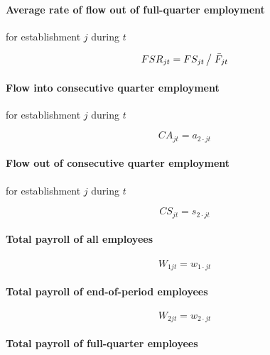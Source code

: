 \paragraph{Average rate of flow out of full-quarter employment}

for establishment $j$ during $t$

\begin{equation}
FSR_{jt} = {FS_{jt} } \left/ {\vphantom {{FS_{jt} } {\bar {F}_{jt} }}}
\right. {\bar {F}_{jt} }
\end{equation}

\paragraph{Flow into consecutive quarter employment}

for establishment $j$ during $t$

\begin{equation}
CA_{jt} = a_{2\cdot jt}
\end{equation}

\paragraph{Flow out of consecutive quarter employment}

for establishment $j$ during $t$

\begin{equation}
CS_{jt} = s_{2\cdot jt}
\end{equation}

\paragraph{Total payroll of all employees}

\begin{equation}
W_{1jt} = w_{1\cdot jt}
\end{equation}

\paragraph{Total payroll of end-of-period employees}

\begin{equation}
W_{2jt} = w_{2\cdot jt}
\end{equation}

\paragraph{Total payroll of full-quarter employees}

